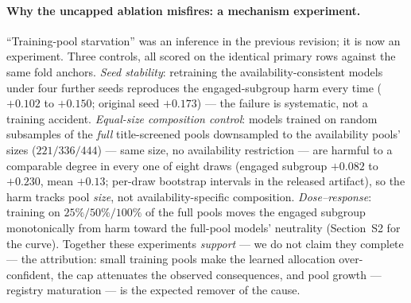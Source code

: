 \documentclass[11pt]{article}
\begin{document}
\paragraph{Why the uncapped ablation misfires: a mechanism experiment.}
``Training-pool starvation'' was an inference in the previous revision; it
is now an experiment. Three controls, all scored on the identical primary
rows against the same fold anchors. \emph{Seed stability}: retraining the
availability-consistent models under four further seeds reproduces the
engaged-subgroup harm every time ($+0.102$ to $+0.150$; original seed
$+0.173$) --- the failure is systematic, not a training accident.
\emph{Equal-size composition control}: models trained on random subsamples
of the \emph{full} title-screened pools downsampled to the availability
pools' sizes ($221/336/444$) --- same size, no availability restriction ---
are harmful to a comparable degree in every one of eight draws (engaged
subgroup $+0.082$ to $+0.230$, mean $+0.13$; per-draw bootstrap intervals
in the released artifact), so the harm tracks pool \emph{size}, not
availability-specific composition. \emph{Dose--response}: training on
$25\%/50\%/100\%$ of the full pools moves the engaged subgroup
monotonically from harm toward the full-pool models' neutrality
(Section~S2 for the curve). Together these experiments \emph{support} ---
we do not claim they complete --- the attribution: small training
pools make the learned allocation over-confident, the cap attenuates the
observed consequences, and pool growth --- registry maturation --- is the
expected remover of the cause.
\end{document}
